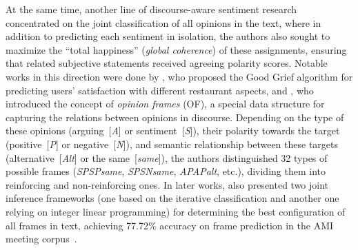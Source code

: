 \documentclass[11pt]{article}
\begin{document}
At the same time, another line of discourse-aware sentiment research
concentrated on the joint classification of all opinions in the text,
where in addition to predicting each sentiment in isolation, the
authors also sought to maximize the ``total happiness'' (\emph{global
  coherence}) of these assignments, ensuring that related subjective
statements received agreeing polarity scores.  Notable works in this
direction were done by , who proposed the Good Grief
algorithm for predicting users' satisfaction with different restaurant
aspects, and , who introduced
the concept of \emph{opinion frames} (OF), a special data structure
for capturing the relations between opinions in discourse.  Depending
on the type of these opinions (arguing~[\emph{A}] or
sentiment~[\emph{S}]), their polarity towards the target
(positive~[\emph{P}] or negative~[\emph{N}]), and semantic
relationship between these targets (alternative~[\emph{Alt}] or the
same~[\emph{same}]), the authors distinguished 32 types of possible
frames (\emph{SPSPsame}, \emph{SPSNsame}, \emph{APAPalt}, etc.),
dividing them into reinforcing and non-reinforcing ones.  In later
works,  also presented two
joint inference frameworks (one based on the iterative classification
and another one relying on integer linear programming) for determining
the best configuration of all frames in text, achieving 77.72\%
accuracy on frame prediction in the AMI meeting
corpus~\cite{Carletta:05}.


\end{document}
